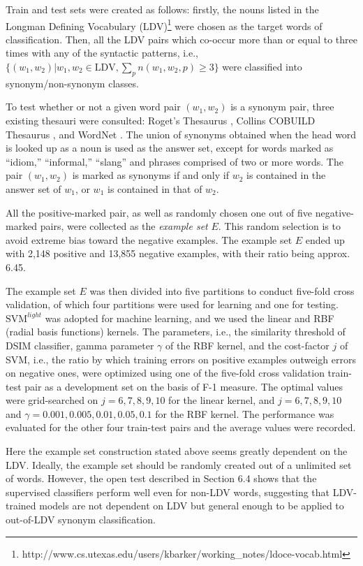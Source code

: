 \documentclass[english]{jnlp_1.4}
\begin{document}
Train and test sets were created as follows: firstly, the nouns
listed in the Longman Defining Vocabulary (LDV)\footnote{
http://www.cs.utexas.edu/users/kbarker/working\_notes/ldoce-vocab.html}
were chosen as the target words of classification. Then, all the LDV
pairs which co-occur more than or equal to three times with any of the
syntactic patterns, i.e., $\{(w_1, w_2) | w_1, w_2 \in \mathrm{LDV},
\sum_p n(w_1, w_2, p) \ge 3 \}$ were classified into
synonym/non-synonym classes.

To test whether or not a given word pair $(w_1, w_2)$ is a synonym
pair, three existing thesauri were consulted: Roget's Thesaurus
\cite{Roget:95}, Collins COBUILD Thesaurus \cite{Collins:02}, and
WordNet \cite{Fellbaum:98}. The union of synonyms obtained when the
head word is looked up as a noun is used as the answer set, except for
words marked as ``idiom,'' ``informal,'' ``slang'' and phrases
comprised of two or more words. The pair $(w_1, w_2)$ is marked as
synonyms if and only if $w_2$ is contained in the answer set of $w_1$,
or $w_1$ is contained in that of $w_2$.

All the positive-marked pair, as well as randomly chosen one out of
five negative-marked pairs, were collected as the \textit{example set}
$E$. This random selection is to avoid extreme bias toward the
negative examples. The example set $E$ ended up with 2,148 positive
and 13,855 negative examples, with their ratio being approx. 6.45.

The example set $E$ was then divided into five partitions to conduct
five-fold cross validation, of which four partitions were used for
learning and one for testing. $\mathrm{SVM}^{light}$ \cite{Joachims:99}
was adopted for machine learning, and we used the linear and RBF
(radial basis functions) kernels. The parameters, i.e., the similarity
threshold of DSIM classifier, gamma parameter $\gamma$ of the RBF
kernel, and the cost-factor $j$ of SVM, i.e., the ratio by which
training errors on positive examples outweigh errors on negative ones,
were optimized using one of the five-fold cross validation train-test
pair as a development set on the basis of F-1 measure. The optimal
values were grid-searched on $j = 6, 7, 8, 9, 10$ for the linear
kernel, and $j = 6, 7, 8, 9, 10$ and $\gamma = 0.001, 0.005, 0.01,
0.05, 0.1$ for the RBF kernel. The performance was evaluated for the
other four train-test pairs and the average values were recorded.

Here the example set construction stated above seems greatly dependent
on the LDV. Ideally, the example set should be randomly created out of
a unlimited set of words. However, the open test described in Section
6.4 shows that the supervised classifiers perform well even for
non-LDV words, suggesting that LDV-trained models are not dependent on
LDV but general enough to be applied to out-of-LDV synonym
classification.
\end{document}
